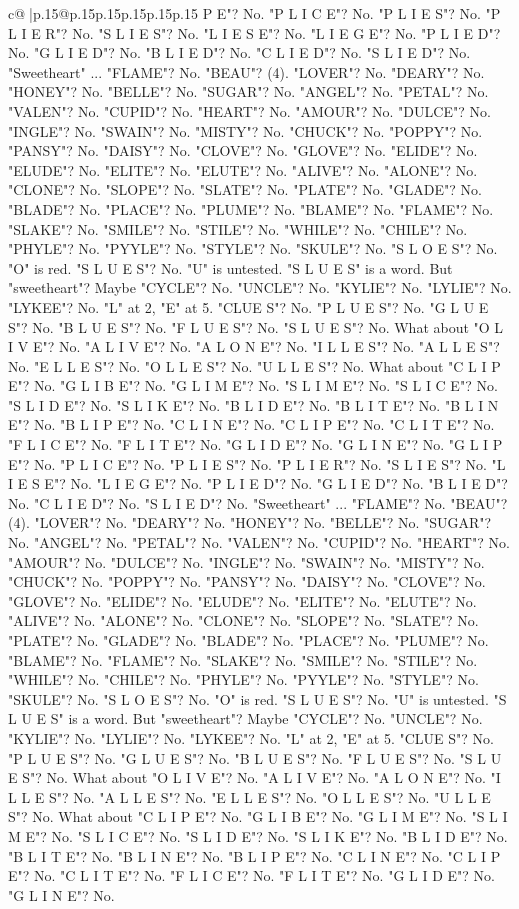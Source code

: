 \documentclass{article}
\begin{document}
{\begin{supertabular}{c@{$\;$}|p{.15\linewidth}@{}p{.15\linewidth}p{.15\linewidth}p{.15\linewidth}p{.15\linewidth}p{.15\linewidth}}
{{{P E"? No. "P L I C E"? No. "P L I E S"? No. "P L I E R"? No. "S L I E S"? No. "L I E S E"? No. "L I E G E"? No. "P L I E D"? No. "G L I E D"? No. "B L I E D"? No. "C L I E D"? No. "S L I E D"? No. "Sweetheart" ... "FLAME"? No. "BEAU"? (4). "LOVER"? No. "DEARY"? No. "HONEY"? No. "BELLE"? No. "SUGAR"? No. "ANGEL"? No. "PETAL"? No. "VALEN"? No. "CUPID"? No. "HEART"? No. "AMOUR"? No. "DULCE"? No. "INGLE"? No. "SWAIN"? No. "MISTY"? No. "CHUCK"? No. "POPPY"? No. "PANSY"? No. "DAISY"? No. "CLOVE"? No. "GLOVE"? No. "ELIDE"? No. "ELUDE"? No. "ELITE"? No. "ELUTE"? No. "ALIVE"? No. "ALONE"? No. "CLONE"? No. "SLOPE"? No. "SLATE"? No. "PLATE"? No. "GLADE"? No. "BLADE"? No. "PLACE"? No. "PLUME"? No. "BLAME"? No. "FLAME"? No. "SLAKE"? No. "SMILE"? No. "STILE"? No. "WHILE"? No. "CHILE"? No. "PHYLE"? No. "PYYLE"? No. "STYLE"? No. "SKULE"? No. "S L O E S"? No. "O" is red. "S L U E S"? No. "U" is untested. "S L U E S" is a word. But "sweetheart"? Maybe "CYCLE"? No. "UNCLE"? No. "KYLIE"? No. "LYLIE"? No. "LYKEE"? No. "L" at 2, "E" at 5. "CLUE S"? No. "P L U E S"? No. "G L U E S"? No. "B L U E S"? No. "F L U E S"? No. "S L U E S"? No. What about "O L I V E"? No. "A L I V E"? No. "A L O N E"? No. "I L L E S"? No. "A L L E S"? No. "E L L E S"? No. "O L L E S"? No. "U L L E S"? No. What about "C L I P E"? No. "G L I B E"? No. "G L I M E"? No. "S L I M E"? No. "S L I C E"? No. "S L I D E"? No. "S L I K E"? No. "B L I D E"? No. "B L I T E"? No. "B L I N E"? No. "B L I P E"? No. "C L I N E"? No. "C L I P E"? No. "C L I T E"? No. "F L I C E"? No. "F L I T E"? No. "G L I D E"? No. "G L I N E"? No. "G L I P E"? No. "P L I C E"? No. "P L I E S"? No. "P L I E R"? No. "S L I E S"? No. "L I E S E"? No. "L I E G E"? No. "P L I E D"? No. "G L I E D"? No. "B L I E D"? No. "C L I E D"? No. "S L I E D"? No. "Sweetheart" ... "FLAME"? No. "BEAU"? (4). "LOVER"? No. "DEARY"? No. "HONEY"? No. "BELLE"? No. "SUGAR"? No. "ANGEL"? No. "PETAL"? No. "VALEN"? No. "CUPID"? No. "HEART"? No. "AMOUR"? No. "DULCE"? No. "INGLE"? No. "SWAIN"? No. "MISTY"? No. "CHUCK"? No. "POPPY"? No. "PANSY"? No. "DAISY"? No. "CLOVE"? No. "GLOVE"? No. "ELIDE"? No. "ELUDE"? No. "ELITE"? No. "ELUTE"? No. "ALIVE"? No. "ALONE"? No. "CLONE"? No. "SLOPE"? No. "SLATE"? No. "PLATE"? No. "GLADE"? No. "BLADE"? No. "PLACE"? No. "PLUME"? No. "BLAME"? No. "FLAME"? No. "SLAKE"? No. "SMILE"? No. "STILE"? No. "WHILE"? No. "CHILE"? No. "PHYLE"? No. "PYYLE"? No. "STYLE"? No. "SKULE"? No. "S L O E S"? No. "O" is red. "S L U E S"? No. "U" is untested. "S L U E S" is a word. But "sweetheart"? Maybe "CYCLE"? No. "UNCLE"? No. "KYLIE"? No. "LYLIE"? No. "LYKEE"? No. "L" at 2, "E" at 5. "CLUE S"? No. "P L U E S"? No. "G L U E S"? No. "B L U E S"? No. "F L U E S"? No. "S L U E S"? No. What about "O L I V E"? No. "A L I V E"? No. "A L O N E"? No. "I L L E S"? No. "A L L E S"? No. "E L L E S"? No. "O L L E S"? No. "U L L E S"? No. What about "C L I P E"? No. "G L I B E"? No. "G L I M E"? No. "S L I M E"? No. "S L I C E"? No. "S L I D E"? No. "S L I K E"? No. "B L I D E"? No. "B L I T E"? No. "B L I N E"? No. "B L I P E"? No. "C L I N E"? No. "C L I P E"? No. "C L I T E"? No. "F L I C E"? No. "F L I T E"? No. "G L I D E"? No. "G L I N E"? No. }}}
\end{supertabular}}
\end{document}

